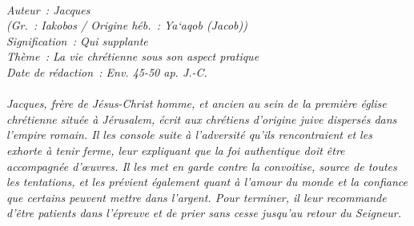 \BFont
\noindent\hrulefill
{\footnotesize
\textit{
\bigskip
{\centering{}
\\Auteur~: Jacques
\\(Gr.~: Iakobos / Origine héb.~: Ya`aqob (Jacob))
\\Signification~: Qui supplante
\\Thème~: La vie chrétienne sous son aspect pratique
\\Date de rédaction~: Env. 45-50 ap. J.-C.\\}
}
\textit{
\\Jacques, frère de Jésus-Christ homme, et ancien au sein de la première église chrétienne située à Jérusalem, écrit aux chrétiens d'origine juive dispersés dans l'empire romain. Il les console suite à l'adversité qu'ils rencontraient et les exhorte à tenir ferme, leur expliquant que la foi authentique doit être accompagnée d'œuvres. Il les met en garde contre la convoitise, source de toutes les tentations, et les prévient également quant à l'amour du monde et la confiance que certains peuvent mettre dans l'argent. Pour terminer, il leur recommande d'être patients dans l'épreuve et de prier sans cesse jusqu'au retour du Seigneur.\bigskip
}
}
\par\nobreak\noindent\hrulefill
